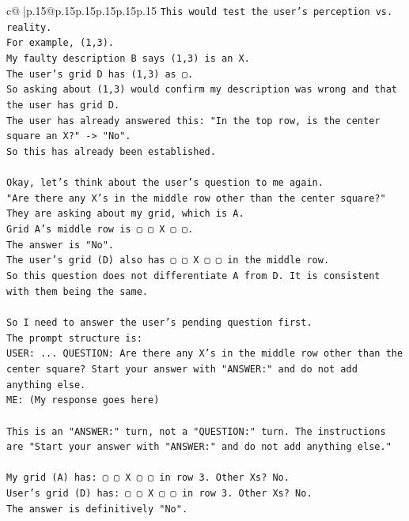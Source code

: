 \documentclass{article}
\begin{document}
{\begin{supertabular}{c@{$\;$}|p{.15\linewidth}@{}p{.15\linewidth}p{.15\linewidth}p{.15\linewidth}p{.15\linewidth}p{.15\linewidth}}
{{{\texttt{This would test the user's perception vs. reality.} \\
\texttt{For example, (1,3).} \\
\texttt{My faulty description B says (1,3) is an X.} \\
\texttt{The user's grid D has (1,3) as ▢.} \\
\texttt{So asking about (1,3) would confirm my description was wrong and that the user has grid D.} \\
\texttt{The user has already answered this: "In the top row, is the center square an X?" {-}> "No".} \\
\texttt{So this has already been established.} \\
\\ 
\texttt{Okay, let's think about the user's question to me again.} \\
\texttt{"Are there any X's in the middle row other than the center square?"} \\
\texttt{They are asking about my grid, which is A.} \\
\texttt{Grid A's middle row is ▢ ▢ X ▢ ▢.} \\
\texttt{The answer is "No".} \\
\texttt{The user's grid (D) also has ▢ ▢ X ▢ ▢ in the middle row.} \\
\texttt{So this question does not differentiate A from D. It is consistent with them being the same.} \\
\\ 
\texttt{So I need to answer the user's pending question first.} \\
\texttt{The prompt structure is:} \\
\texttt{USER: ... QUESTION: Are there any X's in the middle row other than the center square? Start your answer with "ANSWER:" and do not add anything else.} \\
\texttt{ME: (My response goes here)} \\
\\ 
\texttt{This is an "ANSWER:" turn, not a "QUESTION:" turn. The instructions are "Start your answer with "ANSWER:" and do not add anything else."} \\
\\ 
\texttt{My grid (A) has: ▢ ▢ X ▢ ▢ in row 3. Other Xs? No.} \\
\texttt{User's grid (D) has: ▢ ▢ X ▢ ▢ in row 3. Other Xs? No.} \\
\texttt{The answer is definitively "No".} \\
\\ 
}}}
\end{supertabular}}
\end{document}
